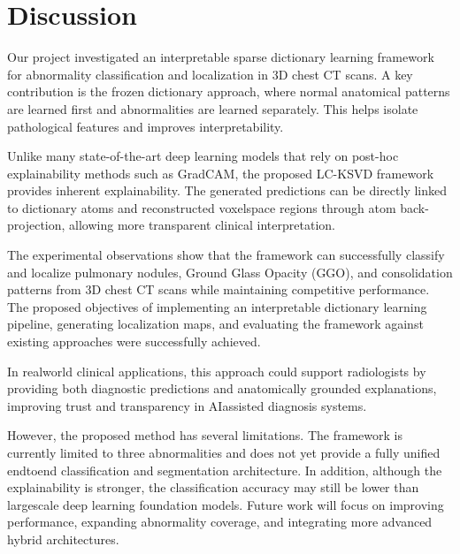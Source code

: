 \chapter{Discussion}
\label{ch:discussion}

Our project investigated an interpretable sparse dictionary learning framework for abnormality classification and localization in 3D chest CT scans. A key contribution is the frozen dictionary approach, where normal anatomical patterns are learned first and abnormalities are learned separately. This helps isolate pathological features and improves interpretability.

Unlike many state-of-the-art deep learning models that rely on post-hoc explainability methods such as GradCAM, the proposed LC-KSVD framework provides inherent explainability. The generated predictions can be directly linked to dictionary atoms and reconstructed voxelspace regions through atom back-projection, allowing more transparent clinical interpretation.

The experimental observations show that the framework can successfully classify and localize pulmonary nodules, Ground Glass Opacity (GGO), and consolidation patterns from 3D chest CT scans while maintaining competitive performance. The proposed objectives of implementing an interpretable dictionary learning pipeline, generating localization maps, and evaluating the framework against existing approaches were successfully achieved.

In realworld clinical applications, this approach could support radiologists by providing both diagnostic predictions and anatomically grounded explanations, improving trust and transparency in AIassisted diagnosis systems.

However, the proposed method has several limitations. The framework is currently limited to three abnormalities and does not yet provide a fully unified endtoend classification and segmentation architecture. In addition, although the explainability is stronger, the classification accuracy may still be lower than largescale deep learning foundation models. Future work will focus on improving performance, expanding abnormality coverage, and integrating more advanced hybrid architectures.
